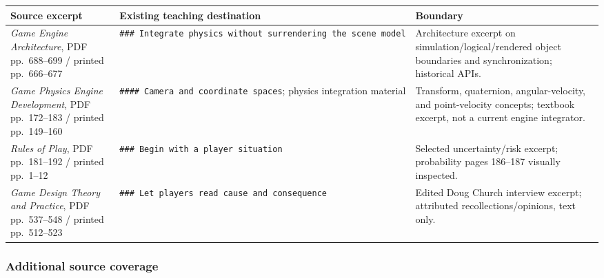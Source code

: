 {\def\LTcaptype{none} %
\begin{longtable}[]{@{}
  >{\raggedright\arraybackslash}p{}
  >{\raggedright\arraybackslash}p{}
  >{\raggedright\arraybackslash}p{}@{}}
\toprule\noalign{}
\begin{minipage}[b]{\linewidth}\raggedright
Source excerpt
\end{minipage} & \begin{minipage}[b]{\linewidth}\raggedright
Existing teaching destination
\end{minipage} & \begin{minipage}[b]{\linewidth}\raggedright
Boundary
\end{minipage} \\
\midrule\noalign{}
\endhead
\bottomrule\noalign{}
\endlastfoot
\emph{Game Engine Architecture}, PDF pp.~688--699 / printed pp.~666--677 & \texttt{\#\#\#\ Integrate\ physics\ without\ surrendering\ the\ scene\ model} & Architecture excerpt on simulation/logical/rendered object boundaries and synchronization; historical APIs. \\
\emph{Game Physics Engine Development}, PDF pp.~172--183 / printed pp.~149--160 & \texttt{\#\#\#\#\ Camera\ and\ coordinate\ spaces}; physics integration material & Transform, quaternion, angular-velocity, and point-velocity concepts; textbook excerpt, not a current engine integrator. \\
\emph{Rules of Play}, PDF pp.~181--192 / printed pp.~1--12 & \texttt{\#\#\#\ Begin\ with\ a\ player\ situation} & Selected uncertainty/risk excerpt; probability pages 186--187 visually inspected. \\
\emph{Game Design Theory and Practice}, PDF pp.~537--548 / printed pp.~512--523 & \texttt{\#\#\#\ Let\ players\ read\ cause\ and\ consequence} & Edited Doug Church interview excerpt; attributed recollections/opinions, text only. \\
\end{longtable}
}

\subsubsection{Additional source coverage}\label{additional-source-coverage}

